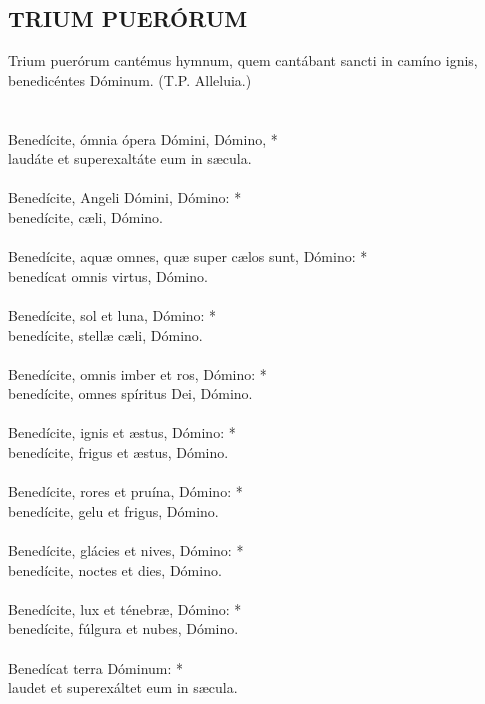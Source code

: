 \documentclass[12pt, a4paper]{article}
\begin{document}
	\newpage
	
	\subsection*{TRIUM PUERÓRUM}
	
	 Trium puerórum cantémus
	hymnum, quem cantábant sancti in
	camíno ignis, benedicéntes
	Dóminum. (T.P. Alleluia.)
	\\\\
	\\
	Benedícite, ómnia ópera Dómini,
	Dómino, *\\ laudáte et superexaltáte
	eum in sæcula.
	\\\\
	Benedícite, Angeli Dómini, Dómino: *\\
	benedícite, cæli, Dómino.
	\\\\
	Benedícite, aquæ omnes, quæ super cælos sunt, Dómino: *\\
	benedícat omnis virtus, Dómino.
	\\\\
	Benedícite, sol et luna, Dómino: *\\
	benedícite, stellæ cæli, Dómino.
	\\\\
	Benedícite, omnis imber et ros, Dómino: *\\
	benedícite, omnes spíritus Dei, Dómino.
	\\\\
	Benedícite, ignis et æstus, Dómino: *\\
	benedícite, frigus et æstus, Dómino.
	\\\\
	Benedícite, rores et pruína, Dómino: *\\
	benedícite, gelu et frigus, Dómino.
	\\\\
	Benedícite, glácies et nives, Dómino: *\\
	benedícite, noctes et dies, Dómino.
	\\\\
	Benedícite, lux et ténebræ, Dómino: *\\
	benedícite, fúlgura et nubes, Dómino.
	\\\\
	Benedícat terra Dóminum: *\\
	laudet et superexáltet eum in sæcula.
\end{document}
